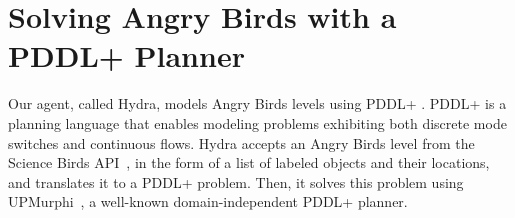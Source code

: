 \documentclass[letterpaper]{article} %
\begin{document}
\section{Solving Angry Birds with a PDDL+ Planner}



Our agent, called Hydra, models Angry Birds levels using PDDL+ \cite{fox2006modelling}. PDDL+ is a planning language that enables modeling problems exhibiting both discrete mode switches and continuous flows. 
Hydra accepts an Angry Birds level from the Science Birds API~\cite{renz2019ai}, in the form of a list of labeled objects and their locations, and translates it to a PDDL+ problem. 
Then, it solves this problem using  UPMurphi~\cite{della2009upmurphi}, a well-known domain-independent PDDL+ planner. %

\end{document}
